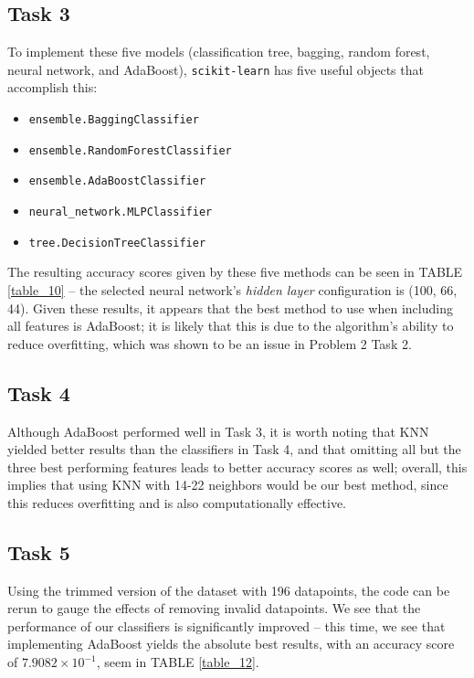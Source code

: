 \documentclass[twoside,twocolumn,10pt]{revtex4-1}
\begin{document}
	\subsection*{Task 3}
	
	To implement these five models (classification tree, bagging, random forest, neural network, and AdaBoost), \texttt{scikit-learn} has five useful objects that accomplish this:
	
	\begin{itemize}
	\item \texttt{ensemble.BaggingClassifier}
	\item \texttt{ensemble.RandomForestClassifier}
	\item \texttt{ensemble.AdaBoostClassifier}
	\item \texttt{neural\_network.MLPClassifier}
	\item \texttt{tree.DecisionTreeClassifier}
	\end{itemize}
	
	The resulting accuracy scores given by these five methods can be seen in TABLE \ref{table_10} – the selected neural network's \textit{hidden layer} configuration is (100, 66, 44). Given these results, it appears that the best method to use when including all features is AdaBoost; it is likely that this is due to the algorithm's ability to reduce overfitting, which was shown to be an issue in Problem 2 Task 2.
	
	\subsection*{Task 4}
	
	Although AdaBoost performed well in Task 3, it is worth noting that KNN yielded better results than the classifiers in Task 4, and that omitting all but the three best performing features leads to better accuracy scores as well; overall, this implies that using KNN with 14-22 neighbors would be our best method, since this reduces overfitting and is also computationally effective.
	
	\subsection*{Task 5}
	
	Using the trimmed version of the dataset with 196 datapoints, the code can be rerun to gauge the effects of removing invalid datapoints.  We see that the performance of our classifiers is significantly improved – this time, we see that implementing AdaBoost yields the absolute best results, with an accuracy score of $7.9082 \times 10^{-1}$, seem in TABLE \ref{table_12}.  
	
\end{document}
